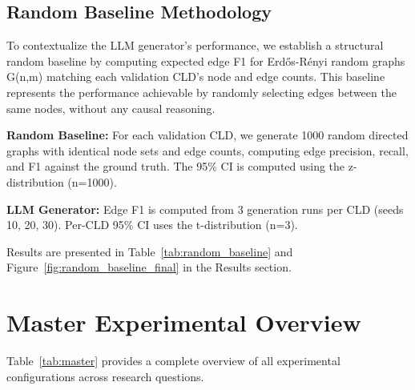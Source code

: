 \subsection{Random Baseline Methodology}

To contextualize the LLM generator's performance, we establish a structural random baseline by computing expected edge F1 for Erd\H{o}s-R\'enyi random graphs G(n,m) matching each validation CLD's node and edge counts. This baseline represents the performance achievable by randomly selecting edges between the same nodes, without any causal reasoning.

\textbf{Random Baseline:} For each validation CLD, we generate 1000 random directed graphs with identical node sets and edge counts, computing edge precision, recall, and F1 against the ground truth. The 95\% CI is computed using the z-distribution (n=1000).

\textbf{LLM Generator:} Edge F1 is computed from 3 generation runs per CLD (seeds 10, 20, 30). Per-CLD 95\% CI uses the t-distribution (n=3).

Results are presented in Table~\ref{tab:random_baseline} and Figure~\ref{fig:random_baseline_final} in the Results section.

\section{Master Experimental Overview}

Table~\ref{tab:master} provides a complete overview of all experimental configurations across research questions.

